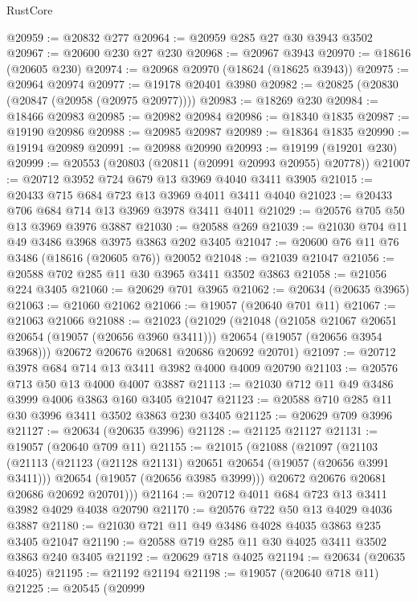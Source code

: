 \begin{lexlean}{RustCore}
\begin{coremodule}
@20959 := @20832 @277
@20964 := @20959 @285 @27 @30 @3943 @3502
@20967 := @20600 @230 @27 @230
@20968 := @20967 @3943
@20970 := @18616 (@20605 @230)
@20974 := @20968 @20970 (@18624 (@18625 @3943))
@20975 := @20964 @20974
@20977 := @19178 @20401 @3980
@20982 := @20825 (@20830 (@20847 (@20958 (@20975 @20977))))
@20983 := @18269 @230
@20984 := @18466 @20983
@20985 := @20982 @20984
@20986 := @18340 @1835
@20987 := @19190 @20986
@20988 := @20985 @20987
@20989 := @18364 @1835
@20990 := @19194 @20989
@20991 := @20988 @20990
@20993 := @19199 (@19201 @230)
@20999 := @20553 (@20803 (@20811 (@20991 @20993 @20955) @20778))
@21007 := @20712 @3952 @724 @679 @13 @3969 @4040 @3411 @3905
@21015 := @20433 @715 @684 @723 @13 @3969 @4011 @3411 @4040
@21023 := @20433 @706 @684 @714 @13 @3969 @3978 @3411 @4011
@21029 := @20576 @705 @50 @13 @3969 @3976 @3887
@21030 := @20588 @269
@21039 := @21030 @704 @11 @49 @3486 @3968 @3975 @3863 @202 @3405
@21047 := @20600 @76 @11 @76 @3486 (@18616 (@20605 @76)) @20052
@21048 := @21039 @21047
@21056 := @20588 @702 @285 @11 @30 @3965 @3411 @3502 @3863
@21058 := @21056 @224 @3405
@21060 := @20629 @701 @3965
@21062 := @20634 (@20635 @3965)
@21063 := @21060 @21062
@21066 := @19057 (@20640 @701 @11)
@21067 := @21063 @21066
@21088 := @21023
    (@21029
      (@21048
        (@21058 @21067 @20651 @20654 (@19057 (@20656 @3960 @3411)))
        @20654
        (@19057 (@20656 @3954 @3968)))
      @20672
      @20676
      @20681
      @20686
      @20692
      @20701)
@21097 := @20712 @3978 @684 @714 @13 @3411 @3982 @4000 @4009 @20790
@21103 := @20576 @713 @50 @13 @4000 @4007 @3887
@21113 := @21030 @712 @11 @49 @3486 @3999 @4006 @3863 @160 @3405 @21047
@21123 := @20588 @710 @285 @11 @30 @3996 @3411 @3502 @3863 @230 @3405
@21125 := @20629 @709 @3996
@21127 := @20634 (@20635 @3996)
@21128 := @21125 @21127
@21131 := @19057 (@20640 @709 @11)
@21155 := @21015
    (@21088
      (@21097
        (@21103
          (@21113
            (@21123 (@21128 @21131) @20651 @20654 (@19057 (@20656 @3991 @3411)))
            @20654
            (@19057 (@20656 @3985 @3999)))
          @20672
          @20676
          @20681
          @20686
          @20692
          @20701)))
@21164 := @20712 @4011 @684 @723 @13 @3411 @3982 @4029 @4038 @20790
@21170 := @20576 @722 @50 @13 @4029 @4036 @3887
@21180 := @21030 @721 @11 @49 @3486 @4028 @4035 @3863 @235 @3405 @21047
@21190 := @20588 @719 @285 @11 @30 @4025 @3411 @3502 @3863 @240 @3405
@21192 := @20629 @718 @4025
@21194 := @20634 (@20635 @4025)
@21195 := @21192 @21194
@21198 := @19057 (@20640 @718 @11)
@21225 := @20545
    (@20999

\end{coremodule}
\end{lexlean}
